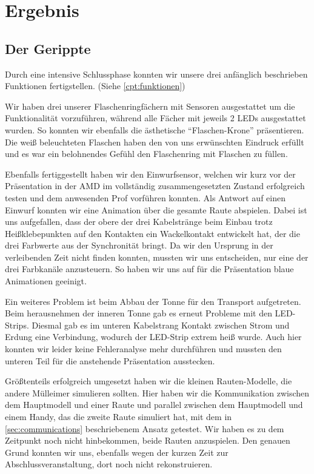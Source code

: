 \chapter{Ergebnis} \label{summary}

\section{Der Gerippte} 
    Durch eine intensive Schlussphase konnten wir unsere drei anfänglich beschrieben Funktionen fertigstellen. (Siehe \ref{cpt:funktionen})

    Wir haben drei unserer Flaschenringfächern mit Sensoren ausgestattet um die Funktionalität vorzuführen, während alle Fächer mit jeweils 2 LEDs ausgestattet wurden. So konnten wir ebenfalls die ästhetische \enquote{Flaschen-Krone} präsentieren. Die weiß beleuchteten Flaschen haben den von uns erwünschten Eindruck erfüllt und es war ein belohnendes Gefühl den Flaschenring mit Flaschen zu füllen.

    Ebenfalls fertiggestellt haben wir den Einwurfsensor, welchen wir kurz vor der Präsentation in der AMD im vollständig zusammengesetzten Zustand erfolgreich testen und dem anwesenden Prof vorführen konnten.
    Als Antwort auf einen Einwurf konnten wir eine Animation über die gesamte Raute abspielen. Dabei ist uns aufgefallen, dass der obere der drei Kabelstränge beim Einbau trotz Heißklebepunkten auf den Kontakten ein Wackelkontakt entwickelt hat, der die drei Farbwerte aus der Synchronität bringt. Da wir den Ursprung in der verleibenden Zeit nicht finden konnten, mussten wir uns entscheiden, nur eine der drei Farbkanäle anzusteuern. So haben wir uns auf für die Präsentation blaue Animationen geeinigt.

    Ein weiteres Problem ist beim Abbau der Tonne für den Transport aufgetreten. Beim herausnehmen der inneren Tonne gab es erneut Probleme mit den LED-Strips. Diesmal gab es im unteren Kabelstrang Kontakt zwischen Strom und Erdung eine Verbindung, wodurch der LED-Strip extrem heiß wurde. Auch hier konnten wir leider keine Fehleranalyse mehr durchführen und mussten den unteren Teil für die anstehende Präsentation ausstecken.

    Größtenteils erfolgreich umgesetzt haben wir die kleinen Rauten-Modelle, die andere Mülleimer simulieren sollten. Hier haben wir die Kommunikation zwischen dem Hauptmodell und einer Raute und parallel zwischen dem Hauptmodell und einem Handy, das die zweite Raute simuliert hat, mit dem in \ref{sec:communications} beschriebenem Ansatz getestet. Wir haben es zu dem Zeitpunkt noch nicht hinbekommen, beide Rauten anzuspielen. Den genauen Grund konnten wir uns, ebenfalls wegen der kurzen Zeit zur Abschlussveranstaltung, dort noch nicht rekonstruieren.

